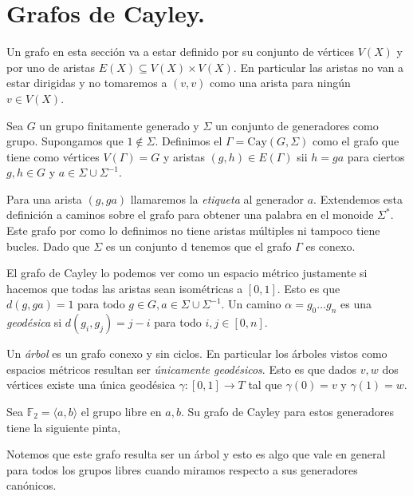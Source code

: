 \documentclass[tesis.tex]{subfiles}
\newcommand{\fg}{grupo finitamente generado }
\begin{document}
\section{Grafos de Cayley.} \label{seccion_treewidth}

Un grafo en esta sección va a estar definido por su conjunto de vértices $V(X)$ y por uno de aristas $E(X) \subseteq V(X) \times V(X)$.
En particular las aristas no van a estar dirigidas y no tomaremos a $(v,v)$ como una arista para ningún $v \in V(X)$.

\begin{deff}
	Sea $G$ un \fg y $\Sigma$ un conjunto de generadores como grupo. 
	Supongamos que $1 \notin \Sigma$.
	Definimos el  $\Gamma = \text{Cay}(G,\Sigma)$ como el grafo que tiene como vértices $V(\Gamma) = G$ y aristas $(g,h) \in E(\Gamma)$ sii $h=ga$ para ciertos $g,h \in G$ y $a \in \Sigma \cup \Sigma^{-1}$. 
\end{deff}

Para una arista $(g,ga)$ llamaremos la \emph{etiqueta} al generador $a$.
Extendemos esta definición a caminos sobre el grafo para obtener una palabra en el monoide $\Sigma^*$.
Este grafo por como lo definimos no tiene aristas múltiples ni tampoco tiene bucles.
Dado que $\Sigma$ es un conjunto d tenemos que el grafo $\Gamma$ es conexo.

El grafo de Cayley lo podemos ver como un espacio métrico justamente si hacemos que todas las aristas sean isométricas a $[0,1]$. 
Esto es que $d(g,ga) = 1$ para todo $g \in G, a \in \Sigma \cup \Sigma^{-1}$. 
Un camino $\alpha = g_0 \dots g_n$ es una \emph{geodésica} si $d(g_i,g_j) = j-i$ para todo $i,j \in [0,n]$.


Un \emph{árbol} es un grafo conexo y sin ciclos. 
En particular los árboles vistos como espacios métricos resultan ser \emph{únicamente geodésicos}. 
Esto es que dados $v,w$ dos vértices existe una única geodésica $\gamma:[0,1] \to T$ tal que $\gamma(0)=v$ y $\gamma(1)=w$.

\begin{ej}
	Sea $\mathbb F_2 = \langle a, b \rangle$ el grupo libre en $a,b$. Su grafo de Cayley para estos generadores tiene la siguiente pinta,
	\bigskip
	\begin{center}
	\end{center}
	
	
	 Notemos que este grafo resulta ser un árbol y esto es algo que vale en general para todos los grupos libres cuando miramos respecto a sus generadores canónicos.
\end{ej}
\end{document}
